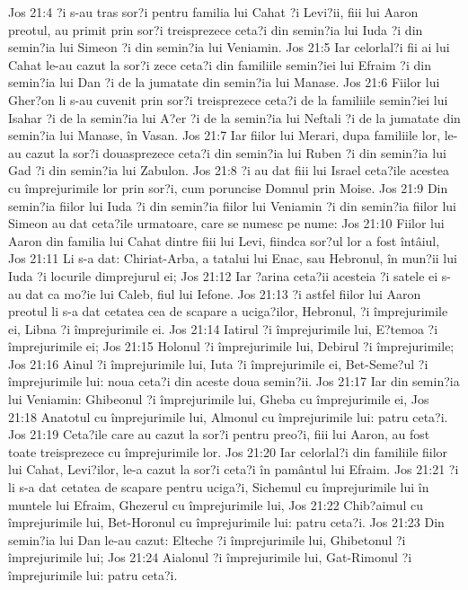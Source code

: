 Jos 21:4  ?i s-au tras sor?i pentru familia lui Cahat ?i Levi?ii, fiii lui Aaron preotul, au primit prin sor?i treisprezece ceta?i din semin?ia lui Iuda ?i din semin?ia lui Simeon ?i din semin?ia lui Veniamin.
Jos 21:5  Iar celorlal?i fii ai lui Cahat le-au cazut la sor?i zece ceta?i din familiile semin?iei lui Efraim ?i din semin?ia lui Dan ?i de la jumatate din semin?ia lui Manase.
Jos 21:6  Fiilor lui Gher?on li s-au cuvenit prin sor?i treisprezece ceta?i de la familiile semin?iei lui Isahar ?i de la semin?ia lui A?er ?i de la semin?ia lui Neftali ?i de la jumatate din semin?ia lui Manase, în Vasan.
Jos 21:7  Iar fiilor lui Merari, dupa familiile lor, le-au cazut la sor?i douasprezece ceta?i din semin?ia lui Ruben ?i din semin?ia lui Gad ?i din semin?ia lui Zabulon.
Jos 21:8  ?i au dat fiii lui Israel ceta?ile acestea cu împrejurimile lor prin sor?i, cum poruncise Domnul prin Moise.
Jos 21:9  Din semin?ia fiilor lui Iuda ?i din semin?ia fiilor lui Veniamin ?i din semin?ia fiilor lui Simeon au dat ceta?ile urmatoare, care se numesc pe nume:
Jos 21:10  Fiilor lui Aaron din familia lui Cahat dintre fiii lui Levi, fiindca sor?ul lor a fost întâiul,
Jos 21:11  Li s-a dat: Chiriat-Arba, a tatalui lui Enac, sau Hebronul, în mun?ii lui Iuda ?i locurile dimprejurul ei;
Jos 21:12  Iar ?arina ceta?ii acesteia ?i satele ei s-au dat ca mo?ie lui Caleb, fiul lui Iefone.
Jos 21:13  ?i astfel fiilor lui Aaron preotul li s-a dat cetatea cea de scapare a uciga?ilor, Hebronul, ?i împrejurimile ei, Libna ?i împrejurimile ei.
Jos 21:14  Iatirul ?i împrejurimile lui, E?temoa ?i împrejurimile ei;
Jos 21:15  Holonul ?i împrejurimile lui, Debirul ?i împrejurimile;
Jos 21:16  Ainul ?i împrejurimile lui, Iuta ?i împrejurimile ei, Bet-Seme?ul ?i împrejurimile lui: noua ceta?i din aceste doua semin?ii.
Jos 21:17  Iar din semin?ia lui Veniamin: Ghibeonul ?i împrejurimile lui, Gheba cu împrejurimile ei,
Jos 21:18  Anatotul cu împrejurimile lui, Almonul cu împrejurimile lui: patru ceta?i.
Jos 21:19  Ceta?ile care au cazut la sor?i pentru preo?i, fiii lui Aaron, au fost toate treisprezece cu împrejurimile lor.
Jos 21:20  Iar celorlal?i din familiile fiilor lui Cahat, Levi?ilor, le-a cazut la sor?i ceta?i în pamântul lui Efraim.
Jos 21:21  ?i li s-a dat cetatea de scapare pentru uciga?i, Sichemul cu împrejurimile lui în muntele lui Efraim, Ghezerul cu împrejurimile lui,
Jos 21:22  Chib?aimul cu împrejurimile lui, Bet-Horonul cu împrejurimile lui: patru ceta?i.
Jos 21:23  Din semin?ia lui Dan le-au cazut: Elteche ?i împrejurimile lui, Ghibetonul ?i împrejurimile lui;
Jos 21:24  Aialonul ?i împrejurimile lui, Gat-Rimonul ?i împrejurimile lui: patru ceta?i.
